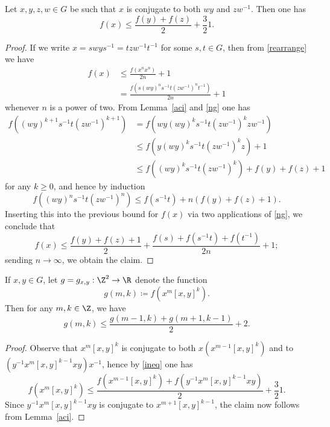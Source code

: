 \begin{proposition}
\begin{lemma}\label{split}
	Let $x,y,z,w \in G$ be such that $x$ is conjugate to both $wy$ and
	$zw^{-1}$.  Then one has
	\begin{equation}\label{ineq}
		f(x) \leq \frac{f(y) + f( z ) }{2}  + \frac{3}{2}
		{ 1}.
	\end{equation}
\end{lemma}

\begin{proof}
	If we write $x = swys^{-1} = t zw^{-1} t^{-1}$ for some $s,t \in G$, then
	from \eqref{rearrange} we have
	\begin{align*}
		f(x) & \leq \frac{f( x^n x^n ) }{2n} + { 1}                    \\
		         & = \frac{f( s(wy)^n s^{-1}t (zw^{-1})^n t^{-1} ) }{2n} + 
		{ 1}
	\end{align*}
	whenever $n$ is a power of two.  From Lemma~\ref{aci} and \eqref{ng} one
	has
	\begin{align*}
		f((wy)^{k+1} s^{-1}t (zw^{-1})^{k+1} ) & = f( w y (wy)^k s^{-1} t                                      
		(zw^{-1})^k z w^{-1} ) \\
		                                           & \leq f( y (wy)^k s^{-1} t (zw^{-1})^k z ) + { 1}              \\
		                                           & \leq f( (wy)^k s^{-1} t (zw^{-1})^k ) + f(y) + f(z) + 
		{ 1}
	\end{align*}
	for any $k \geq 0$, and hence by induction
	\[
		f((wy)^n s^{-1}t (zw^{-1})^n ) \leq f(s^{-1} t) + n ( f(y) +
		f(z) + { 1} ).
	\]
	Inserting this into the previous bound for $f(x)$ via two
	applications of \eqref{ng}, we conclude that
	\[
		f(x) \leq \frac{f(y) + f(z)+ { 1} }{2} +
		\frac{f(s) + f(s^{-1}t) + f(t^{-1}) }{2n} + { 1};
	\]
	sending $n \to \infty$, we obtain the claim.
\end{proof}


\begin{corollary}
	If $x,y \in G$, let $g = g_{x,y}: \Z^2 \to \R$ denote the function
	\[
		g(m,k) \coloneqq f( x^m [x,y]^k ).
	\]
	Then for any $m,k \in \Z$, we have
	\begin{equation}\label{fmk}
		g(m,k) \leq \frac{g(m-1,k) + g(m+1,k-1)}{2} + { 2}.
	\end{equation}
\end{corollary}

\begin{proof}
	Observe that $x^m [x,y]^k$ is conjugate to both $x (x^{m-1} [x,y]^k)$ and
	to $(y^{-1} x^m [x,y]^{k-1} xy) x^{-1}$, hence by \eqref{ineq} one has
	\[
		f( x^m [x,y]^k ) \leq \frac{f( x^{m-1} [x,y]^k ) + f( y^{-1}
			x^{m} [x,y]^{k-1} xy )}{2} + { \frac{3}{2} 1}.
    \]
    Since $y^{-1} x^{m} [x,y]^{k-1} xy $ is conjugate to $x^{m+1}
    [x,y]^{k-1}$, the claim now follows from Lemma~\ref{aci}.
\end{proof}
		

\end{proposition}
